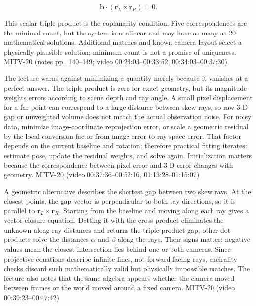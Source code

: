 \[
\mathbf{b}\cdot(\mathbf{r}_L\times\mathbf{r}_R)=0.
\]

This scalar triple product is the coplanarity condition. Five correspondences are the minimal count, but the system is nonlinear and may have as many as 20 mathematical solutions. Additional matches and known camera layout select a physically plausible solution; minimum count is not a promise of uniqueness. \hyperref[04-visual-computing-ii-ch036]{MITV-20} (notes pp.~140--149; video 00:23:03--00:33:52, 00:34:03--00:37:30)

The lecture warns against minimizing a quantity merely because it vanishes at a perfect answer. The triple product is zero for exact geometry, but its magnitude weights errors according to scene depth and ray angle. A small pixel displacement for a far point can correspond to a large distance between skew rays, so raw 3-D gap or unweighted volume does not match the actual observation noise. For noisy data, minimize image-coordinate reprojection error, or scale a geometric residual by the local conversion factor from image error to ray-space error. That factor depends on the current baseline and rotation; therefore practical fitting iterates: estimate pose, update the residual weights, and solve again. Initialization matters because the correspondence between pixel error and 3-D error changes with geometry. \hyperref[04-visual-computing-ii-ch036]{MITV-20} (video 00:37:36--00:52:16, 01:13:28--01:15:07)

A geometric alternative describes the shortest gap between two skew rays. At the closest points, the gap vector is perpendicular to both ray directions, so it is parallel to \(\mathbf{r}_L\times\mathbf{r}_R\). Starting from the baseline and moving along each ray gives a vector closure equation. Dotting it with the cross product eliminates the unknown along-ray distances and returns the triple-product gap; other dot products solve the distances \(\alpha\) and \(\beta\) along the rays. Their signs matter: negative values mean the closest intersection lies behind one or both cameras. Since projective equations describe infinite lines, not forward-facing rays, cheirality checks discard such mathematically valid but physically impossible matches. The lecture also notes that the same algebra appears whether the camera moved between frames or the world moved around a fixed camera. \hyperref[04-visual-computing-ii-ch036]{MITV-20} (video 00:39:23--00:47:42)


